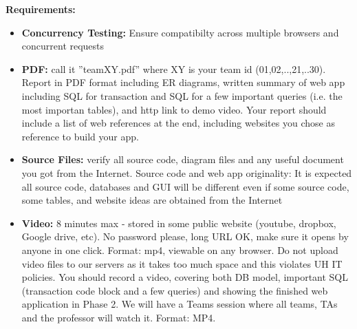 \documentclass[11pt, a4paper]{article}
\begin{document}
\textbf{Requirements:} 

\begin{itemize}
    \item \textbf{Concurrency Testing:} Ensure compatibilty across multiple browsers and concurrent requests
    \item  \textbf{PDF:} call it ”teamXY.pdf” where XY is your team id (01,02,..,21,..30). Report in PDF format
        including ER diagrams, written summary of web app including SQL for transaction and SQL
        for a few important queries (i.e. the most importan tables), and http link to demo video. Your
        report should include a list of web references at the end, including websites you chose as reference
        to build your app.
    \item \textbf{Source Files:} verify all source code, diagram files and any useful document you got from the Internet.
        Source code and web app originality: It is expected all source code, databases and GUI will be
        different even if some source code, some tables, and website ideas are obtained from the Internet
    \item \textbf{Video:} 8 minutes max - stored in some public website (youtube, dropbox, Google drive, etc).
        No password please, long URL OK, make sure it opens by anyone in one click. Format: mp4,
        viewable on any browser. Do not upload video files to our servers as it takes too much space
        and this violates UH IT policies.
        You should record a video, covering both DB model, important SQL (transaction code block
        and a few queries) and showing the finished web application in Phase 2. We will have a Teams
        session where all teams, TAs and the professor will watch it. Format: MP4.
\end{itemize}
\end{document}
